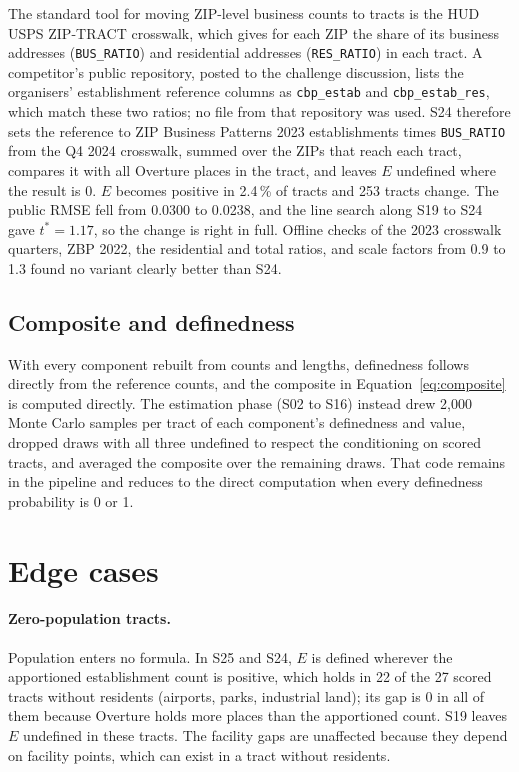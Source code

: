 \documentclass[11pt]{article}
\begin{document}
The standard tool for moving ZIP-level business counts to tracts is the HUD
USPS ZIP-TRACT crosswalk, which gives for each ZIP the share of its business
addresses (\texttt{BUS\_RATIO}) and residential addresses
(\texttt{RES\_RATIO}) in each tract. A competitor's public repository,
posted to the challenge discussion, lists the organisers' establishment
reference columns as \texttt{cbp\_estab} and \texttt{cbp\_estab\_res}, which
match these two ratios; no file from that repository was used. S24 therefore
sets the reference to ZIP Business Patterns 2023 establishments times
\texttt{BUS\_RATIO} from the Q4 2024 crosswalk, summed over the ZIPs that
reach each tract, compares it with all Overture places in the tract, and
leaves $E$ undefined where the result is 0. $E$ becomes positive in 2.4\,\%
of tracts and 253 tracts change. The public RMSE fell from 0.0300 to 0.0238,
and the line search along S19 to S24 gave $t^\ast = 1.17$, so the change is
right in full. Offline checks of the 2023 crosswalk quarters, ZBP 2022, the
residential and total ratios, and scale factors from 0.9 to 1.3 found no
variant clearly better than S24.

\subsection{Composite and definedness}

With every component rebuilt from counts and lengths, definedness follows
directly from the reference counts, and the composite in Equation~\ref{eq:composite} is
computed directly. The estimation phase (S02 to S16) instead drew 2,000 Monte
Carlo samples per tract of each component's definedness and value, dropped
draws with all three undefined to respect the conditioning on scored tracts,
and averaged the composite over the remaining draws. That code remains in the
pipeline and reduces to the direct computation when every definedness
probability is 0 or 1.

\section{Edge cases}
\label{sec:edge}

\paragraph{Zero-population tracts.} Population enters no formula. In S25 and S24, $E$
is defined wherever the apportioned establishment count is positive, which
holds in 22 of the 27 scored tracts without residents (airports, parks,
industrial land); its gap is 0 in all of them because Overture holds more
places than the apportioned count. S19 leaves $E$ undefined in these tracts.
The facility gaps are unaffected because they depend on facility points,
which can exist in a tract without residents.
\end{document}
